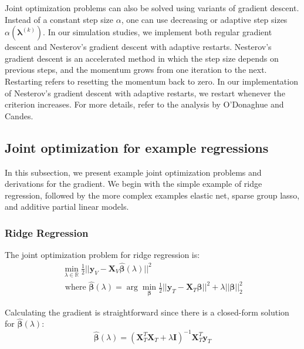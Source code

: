 \documentclass[10pt,letterpaper]{article}
\begin{document}
Joint optimization problems can also be solved using variants of gradient descent. Instead of a constant step size $\alpha$, one can use decreasing or adaptive step sizes $\alpha(\boldsymbol{\lambda}^{(k)})$. In our simulation studies, we implement both regular gradient descent and Nesterov's gradient descent with adaptive restarts. Nesterov's gradient descent is an accelerated method in which the step size depends on previous steps, and the momentum grows from one iteration to the next. Restarting refers to resetting the momentum back to zero. In our implementation of Nesterov's gradient descent with adaptive restarts, we restart whenever the criterion increases. For more details, refer to the analysis by O'Donaghue and Candes.

\subsection{Joint optimization for example regressions}

In this subsection, we present example joint optimization problems and derivations for the gradient. We begin with the simple example of ridge regression, followed by the more complex examples elastic net, sparse group lasso, and additive partial linear models.

\subsubsection{Ridge Regression}

The joint optimization problem for ridge regression is:
\begin{equation}
\begin{array}{c}
\min_{\lambda\in \mathbb{R}} \frac{1}{2} \lvert\lvert \boldsymbol{y}_V - \boldsymbol{X}_V \hat{\boldsymbol{\beta}} (\lambda) \rvert\rvert ^2 \\
\text{  where  } \hat{\boldsymbol{\beta}} (\lambda) = \arg \min_{\boldsymbol{\beta}} \frac{1}{2} \lvert\lvert \boldsymbol{y}_T - \boldsymbol{X}_T \boldsymbol{\beta} \rvert\rvert ^2 + \lambda \lvert\lvert \boldsymbol{\beta} \rvert\rvert_2^2
\end{array}
\end{equation}

Calculating the gradient is straightforward since there is a closed-form solution for $\hat{\boldsymbol{\beta}}(\lambda)$:
\begin{equation}
\hat{\boldsymbol{\beta}} (\lambda) = (\boldsymbol{X}_T^T\boldsymbol{X}_T + \lambda \boldsymbol{I})^{-1}\boldsymbol{X}_T^T\boldsymbol{y}_T
\end{equation}
\end{document}
